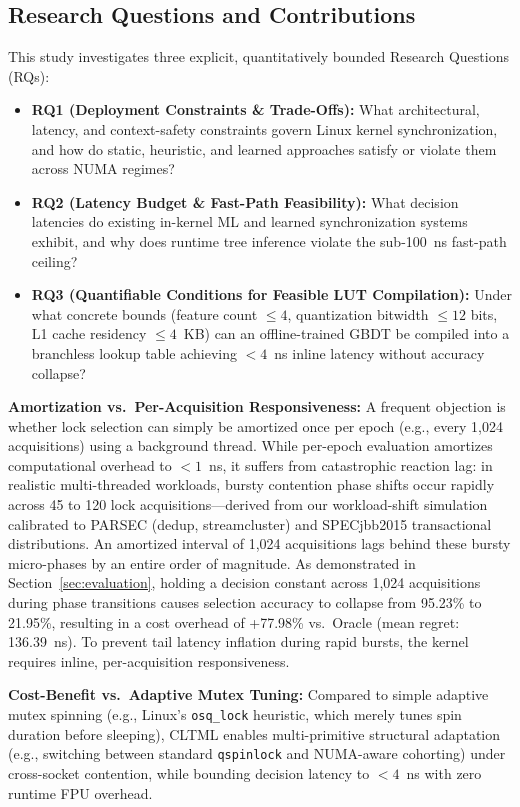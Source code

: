 \documentclass[conference]{IEEEtran}
\begin{document}
\subsection{Research Questions and Contributions}
This study investigates three explicit, quantitatively bounded Research Questions (RQs):
\begin{itemize}
    \item \textbf{RQ1 (Deployment Constraints \& Trade-Offs):} What architectural, latency, and context-safety constraints govern Linux kernel synchronization, and how do static, heuristic, and learned approaches satisfy or violate them across NUMA regimes?
    \item \textbf{RQ2 (Latency Budget \& Fast-Path Feasibility):} What decision latencies do existing in-kernel ML and learned synchronization systems exhibit, and why does runtime tree inference violate the sub-100~ns fast-path ceiling?
    \item \textbf{RQ3 (Quantifiable Conditions for Feasible LUT Compilation):} Under what concrete bounds (feature count $\le 4$, quantization bitwidth $\le 12$ bits, L1 cache residency $\le 4$~KB) can an offline-trained GBDT be compiled into a branchless lookup table achieving $<4$~ns inline latency without accuracy collapse?
\end{itemize}

\textbf{Amortization vs.\ Per-Acquisition Responsiveness:} A frequent objection is whether lock selection can simply be amortized once per epoch (e.g., every 1,024 acquisitions) using a background thread. While per-epoch evaluation amortizes computational overhead to $<1$~ns, it suffers from catastrophic reaction lag: in realistic multi-threaded workloads, bursty contention phase shifts occur rapidly across 45 to 120 lock acquisitions---derived from our workload-shift simulation calibrated to PARSEC (dedup, streamcluster) and SPECjbb2015 transactional distributions. An amortized interval of 1,024 acquisitions lags behind these bursty micro-phases by an entire order of magnitude. As demonstrated in Section~\ref{sec:evaluation}, holding a decision constant across 1,024 acquisitions during phase transitions causes selection accuracy to collapse from 95.23\% to 21.95\%, resulting in a cost overhead of +77.98\% vs.\ Oracle (mean regret: 136.39~ns). To prevent tail latency inflation during rapid bursts, the kernel requires inline, per-acquisition responsiveness.

\textbf{Cost-Benefit vs.\ Adaptive Mutex Tuning:} Compared to simple adaptive mutex spinning (e.g., Linux's \texttt{osq\_lock} heuristic, which merely tunes spin duration before sleeping), CLTML enables multi-primitive structural adaptation (e.g., switching between standard \texttt{qspinlock} and NUMA-aware cohorting) under cross-socket contention, while bounding decision latency to $<4$~ns with zero runtime FPU overhead.
\end{document}
